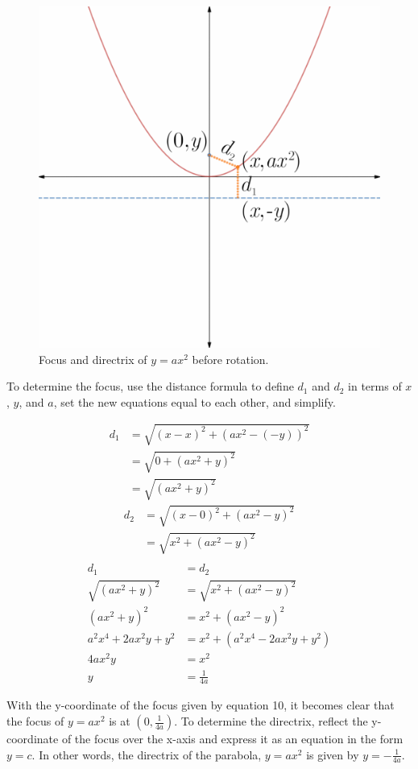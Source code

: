 \documentclass{article}
\begin{document}
\begin{figure}[h!]
  \centering
  \includegraphics[width=0.6\linewidth]{Blender/ParabolaLineIntegration-DiskFD1-f2_0001.png}
  \caption{Focus and directrix of $y=ax^2$ before rotation.}
  \label{fig:disk2}
\end{figure}\par

To determine the focus, use the distance formula to define $d_1$ and $d_2$ in terms of $x$, $y$, and $a$, set the new equations equal to each other, and simplify.

\begin{align*}
d_1 &= \sqrt{\left(x-x\right)^2+\left(ax^2-(-y)\right)^2}\\
       &= \sqrt{0+\left(ax^2+y\right)^2}\\
       &= \sqrt{\left(ax^2+y\right)^2}
\end{align*}
\begin{align*}
d_2 &= \sqrt{\left(x-0\right)^2+\left(ax^2-y\right)^2}\\
       &= \sqrt{x^2+\left(ax^2-y\right)^2}\\
\end{align*}
\begin{align*}
d_1 &= d_2\\
\sqrt{\left(ax^2+y\right)^2} &= \sqrt{x^2+\left(ax^2-y\right)^2}\\
\left(ax^2+y\right)^2 &= x^2+\left(ax^2-y\right)^2\\
a^2x^4+2ax^2y+y^2 &= x^2+\left(a^2x^4-2ax^2y+y^2\right)\\
4ax^2y &= x^2\\
y &= \frac{1}{4a}\tag{10}
\end{align*}\par

With the y-coordinate of the focus given by equation 10, it becomes clear that the focus of $y=ax^2$ is at $\left(0,\frac{1}{4a}\right)$. To determine the directrix, reflect the y-coordinate of the focus over the x-axis and express it as an equation in the form $y=c$. In other words, the directrix of the parabola, $y=ax^2$ is given by $y=-\frac{1}{4a}$.
\end{document}
